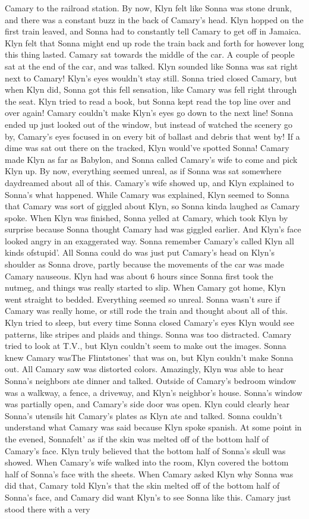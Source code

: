 \documentclass[12pt]{book}
\begin{document}
Camary to the railroad station. By now, Klyn felt like Sonna was stone drunk, and there was a constant buzz in the back of Camary's head. Klyn hopped on the first train leaved, and Sonna had to constantly tell Camary to get off in Jamaica. Klyn felt that Sonna might end up rode the train back and forth for however long this thing lasted. Camary sat towards the middle of the car. A couple of people sat at the end of the car, and was talked. Klyn sounded like Sonna was sat right next to Camary! Klyn's eyes wouldn't stay still. Sonna tried closed Camary, but when Klyn did, Sonna got this fell sensation, like Camary was fell right through the seat. Klyn tried to read a book, but Sonna kept read the top line over and over again! Camary couldn't make Klyn's eyes go down to the next line! Sonna ended up just looked out of the window, but instead of watched the scenery go by, Camary's eyes focused in on every bit of ballast and debris that went by! If a dime was sat out there on the tracked, Klyn would've spotted Sonna! Camary made Klyn as far as Babylon, and Sonna called Camary's wife to come and pick Klyn up. By now, everything seemed unreal, as if Sonna was sat somewhere daydreamed about all of this. Camary's wife showed up, and Klyn explained to Sonna's what happened. While Camary was explained, Klyn seemed to Sonna that Camary was sort of giggled about Klyn, so Sonna kinda laughed as Camary spoke. When Klyn was finished, Sonna yelled at Camary, which took Klyn by surprise because Sonna thought Camary had was giggled earlier. And Klyn's face looked angry in an exaggerated way. Sonna remember Camary's called Klyn all kinds ofstupid'. All Sonna could do was just put Camary's head on Klyn's shoulder as Sonna drove, partly because the movements of the car was made Camary nauseous. Klyn had was about 6 hours since Sonna first took the nutmeg, and things was really started to slip. When Camary got home, Klyn went straight to bedded. Everything seemed so unreal. Sonna wasn't sure if Camary was really home, or still rode the train and thought about all of this. Klyn tried to sleep, but every time Sonna closed Camary's eyes Klyn would see patterns, like stripes and plaids and things. Sonna was too distracted. Camary tried to look at T.V., but Klyn couldn't seem to make out the images. Sonna knew Camary wasThe Flintstones' that was on, but Klyn couldn't make Sonna out. All Camary saw was distorted colors. Amazingly, Klyn was able to hear Sonna's neighbors ate dinner and talked. Outside of Camary's bedroom window was a walkway, a fence, a driveway, and Klyn's neighbor's house. Sonna's window was partially open, and Camary's side door was open. Klyn could clearly hear Sonna's utensils hit Camary's plates as Klyn ate and talked. Sonna couldn't understand what Camary was said because Klyn spoke spanish. At some point in the evened, Sonnafelt' as if the skin was melted off of the bottom half of Camary's face. Klyn truly believed that the bottom half of Sonna's skull was showed. When Camary's wife walked into the room, Klyn covered the bottom half of Sonna's face with the sheets. When Camary asked Klyn why Sonna was did that, Camary told Klyn's that the skin melted off of the bottom half of Sonna's face, and Camary did want Klyn's to see Sonna like this. Camary just stood there with a very 
\end{document}
